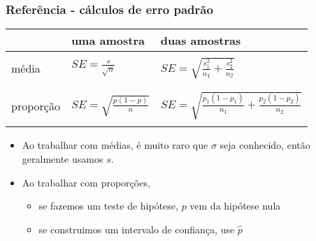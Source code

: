 \begin{frame}
\frametitle{Referência - cálculos de erro padrão}

\begin{center}
\begin{tabular}{l | l | l}
			& uma amostra					& duas amostras \\ 
\hline
& & \\
média		& $SE = \frac{s}{\sqrt{n}}$			& $SE = \sqrt{ \frac{s_1^2}{n_1} + \frac{s_2^2}{n_2}}$ \\
& & \\
\hline
& & \\
proporção		& $SE = \sqrt{ \frac{p(1-p)}{n} }$	& $SE = \sqrt{ \frac{p_1(1-p_1)}{n_1} + \frac{p_2(1-p_2)}{n_2} }$	 \\	
& & \\
\end{tabular}
\end{center}

\pause

\begin{itemize}
\justifying
\item Ao trabalhar com médias, é muito raro que $\sigma$ seja conhecido, então geralmente usamos $s$.

\pause
\justifying
\item Ao trabalhar com proporções, 
\begin{itemize}
\justifying
\item se fazemos um teste de hipótese, $p$ vem da hipótese nula
\justifying
\item se construimos um intervalo de confiança, use $\hat{p}$
\end{itemize}

\end{itemize}

\end{frame}